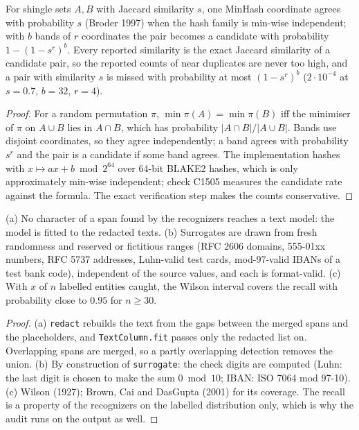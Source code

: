 \begin{proposition}\label{prop:txminhash}
For shingle sets $A,B$ with Jaccard similarity $s$, one MinHash coordinate agrees with probability $s$ (Broder 1997)
when the hash family is min-wise independent; with $b$ bands of $r$ coordinates the pair becomes a candidate with
probability $1-(1-s^r)^b$. Every reported similarity is the exact Jaccard similarity of a candidate pair, so the
reported counts of near duplicates are never too high, and a pair with similarity $s$ is missed with probability at
most $(1-s^r)^b$ ($2\cdot10^{-4}$ at $s=0.7$, $b=32$, $r=4$).
\end{proposition}
\begin{proof}
For a random permutation $\pi$, $\min\pi(A)=\min\pi(B)$ iff the minimiser of $\pi$ on $A\cup B$ lies in $A\cap B$,
which has probability $|A\cap B|/|A\cup B|$. Bands use disjoint coordinates, so they agree independently; a band
agrees with probability $s^r$ and the pair is a candidate if some band agrees. The implementation hashes with
$x\mapsto ax+b\bmod 2^{64}$ over 64-bit BLAKE2 hashes, which is only approximately min-wise independent; check C1505
measures the candidate rate against the formula. The exact verification step makes the counts conservative.
\end{proof}

\begin{proposition}\label{prop:txpii}
(a) No character of a span found by the recognizers reaches a text model: the model is fitted to the redacted texts.
(b) Surrogates are drawn from fresh randomness and reserved or fictitious ranges (RFC 2606 domains, 555-01xx numbers,
RFC 5737 addresses, Luhn-valid test cards, mod-97-valid IBANs of a test bank code), independent of the source values,
and each is format-valid. (c) With $x$ of $n$ labelled entities caught, the Wilson interval covers the recall with
probability close to $0.95$ for $n\ge 30$.
\end{proposition}
\begin{proof}
(a) \texttt{redact} rebuilds the text from the gaps between the merged spans and the placeholders, and
\texttt{TextColumn.fit} passes only the redacted list on. Overlapping spans are merged, so a partly overlapping detection
removes the union. (b) By construction of \texttt{surrogate}: the check digits are computed (Luhn: the last digit is
chosen to make the sum $0\bmod 10$; IBAN: ISO 7064 mod 97-10). (c) Wilson (1927); Brown, Cai and DasGupta (2001) for
its coverage. The recall is a property of the recognizers on the labelled distribution only, which is why the audit
runs on the output as well.
\end{proof}

